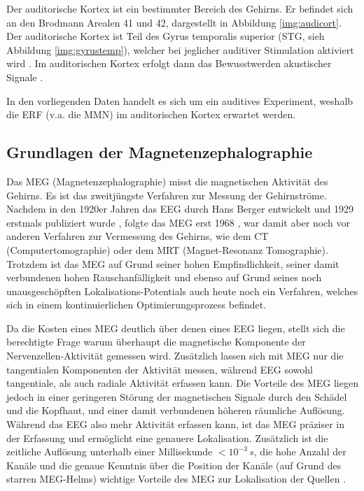 \documentclass[doc,a4paper,12pt]{apa6}
\begin{document}
Der auditorische Kortex ist ein bestimmter Bereich des Gehirns. Er befindet sich an den Brodmann Arealen 41 und 42, dargestellt in Abbildung \ref{img:audicort}. Der auditorische Kortex ist Teil des Gyrus temporalis superior (STG, sieh Abbildung \ref{img:gyrustemp}), welcher bei jeglicher auditiver Stimulation aktiviert wird \parencite{binder1994functional}. Im auditorischen Kortex erfolgt dann das Bewusstwerden akustischer Signale \parencite{jaaskelainen2004human}.

In den vorliegenden Daten handelt es sich um ein auditives Experiment, weshalb die ERF (v.a. die MMN) im auditorischen Kortex erwartet werden.


\subsection{Grundlagen der Magnetenzephalographie}

Das MEG (Magnetenzephalographie) misst die magnetischen Aktivität des Gehirns. Es ist das zweitjüngste Verfahren zur Messung der Gehirnströme. Nachdem in den 1920er Jahren das EEG durch Hans Berger entwickelt und 1929 erstmals publiziert wurde \parencite{berger1929elektrenkephalogramm}, folgte das MEG erst 1968 \parencite{cohen1968magnetoencephalography}, war damit aber noch vor anderen Verfahren zur Vermessung des Gehirns, wie dem CT (Computertomographie) oder dem MRT (Magnet-Resonanz Tomographie). Trotzdem ist das MEG auf Grund seiner hohen Empfindlichkeit, seiner damit verbundenen hohen Rauschanfälligkeit und ebenso auf Grund seines noch unausgeschöpften Lokalisations-Potentials auch heute noch ein Verfahren, welches sich in einem kontinuierlichen Optimierungsprozess befindet.

Da die Kosten eines MEG deutlich über denen eines EEG liegen, stellt sich die berechtigte Frage warum überhaupt die magnetische Komponente der Nervenzellen-Aktivität gemessen wird. Zusätzlich lassen sich mit MEG nur die tangentialen Komponenten der Aktivität messen, während EEG sowohl tangentiale, als auch radiale Aktivität erfassen kann. Die Vorteile des MEG liegen jedoch in einer geringeren Störung der magnetischen Signale durch den Schädel und die Kopfhaut, und einer damit verbundenen höheren räumliche Auflösung. Während das EEG also mehr Aktivität erfassen kann, ist das MEG präziser in der Erfassung und ermöglicht eine genauere Lokalisation. Zusätzlich ist die zeitliche Auflösung unterhalb einer Millisekunde $< 10^{-3}\,s$, die hohe Anzahl der Kanäle und die genaue Kenntnis über die Position der Kanäle (auf Grund des starren MEG-Helms) wichtige Vorteile des MEG zur Lokalisation der Quellen  \parencite{malmivuo2012comparison}.
\end{document}
